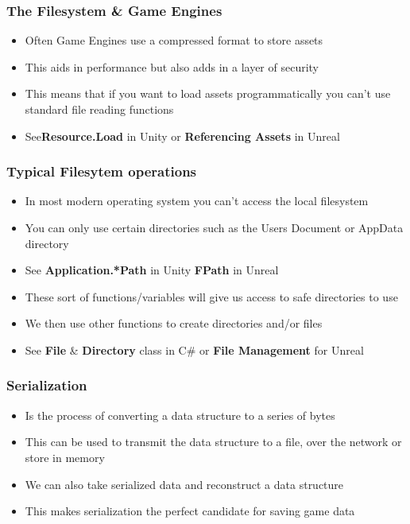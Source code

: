\begin{frame}
	\frametitle{The Filesystem \& Game Engines}
	\begin{itemize}
  		\item Often Game Engines use a compressed format to store assets
  		\item This aids in performance but also adds in a layer of security
  		\item This means that if you want to load assets programmatically you can't use standard file reading functions
  		\item See\textbf{Resource.Load} in Unity or \textbf{Referencing Assets} in Unreal
	\end{itemize}
\end{frame}

\begin{frame}
	\frametitle{Typical Filesytem operations}
  \begin{itemize}
    \item In most modern operating system you can't access the local filesystem
    \item You can only use certain directories such as the Users Document or AppData directory
    \item See \textbf{Application.*Path} in Unity \textbf{FPath} in Unreal
    \item These sort of functions/variables will give us access to safe directories to use
    \item We then use other functions to create directories and/or files
    \item See \textbf{File} \& \textbf{Directory} class in C\# or \textbf{File Management} for Unreal
  \end{itemize}
\end{frame}

\begin{frame}
	\frametitle{Serialization}
  \begin{itemize}
    \item Is the process of converting a data structure to a series of bytes
    \item This can be used to transmit the data structure to a file, over the network or store in memory
    \item We can also take serialized data and reconstruct a data structure
    \item This makes serialization the perfect candidate for saving game data
  \end{itemize}
\end{frame}

